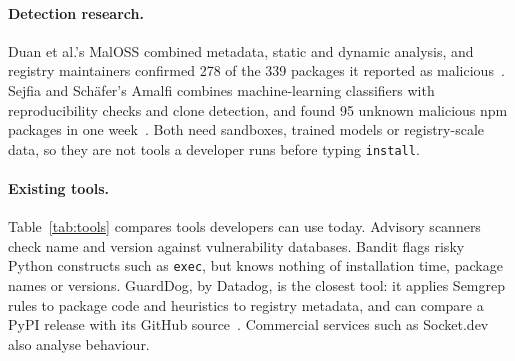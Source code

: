 \documentclass[runningheads]{llncs}
\begin{document}
\paragraph{Detection research.} Duan et al.'s MalOSS combined metadata, static and dynamic analysis, and registry maintainers confirmed 278 of the 339 packages it reported as malicious~\cite{duan2021measuring}. Sejfia and Sch\"afer's Amalfi combines machine-learning classifiers with reproducibility checks and clone detection, and found 95 unknown malicious npm packages in one week~\cite{sejfia2022amalfi}. Both need sandboxes, trained models or registry-scale data, so they are not tools a developer runs before typing \texttt{install}.

\paragraph{Existing tools.} Table~\ref{tab:tools} compares tools developers can use today. Advisory scanners check name and version against vulnerability databases. Bandit flags risky Python constructs such as \texttt{exec}, but knows nothing of installation time, package names or versions. GuardDog, by Datadog, is the closest tool: it applies Semgrep rules to package code and heuristics to registry metadata, and can compare a PyPI release with its GitHub source~\cite{guarddog}. Commercial services such as Socket.dev also analyse behaviour.
\end{document}
